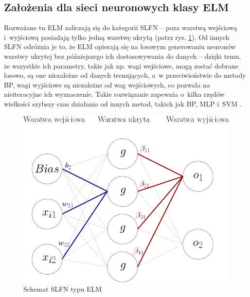 \documentclass{article}
\begin{document}
\subsection{Założenia dla sieci neuronowych klasy ELM}
Rozważane tu ELM zaliczają się do kategorii SLFN -- poza warstwą wejściową i~wyjściową posiadają tylko jedną warstwę ukrytą (patrz rys. \ref{schemat_elm}). Od innych SLFN odróżnia je to, że ELM opierają się na losowym generowaniu neuronów warstwy ukrytej bez późniejszego ich dostosowywania do danych -- dzięki temu, że wszystkie ich parametry, takie jak np. wagi wejściowe, mogą zostać dobrane losowo, są one niezależne od danych trenujących, a~w przeciwieństwie do metody BP, wagi wyjściowe są niezależne od wag wejściowych, co pozwala na nieiteracyjne ich wyznaczenie. Takie rozwiązanie zapewnia o~kilka rzędów wielkości szybszy czas działania od innych metod, takich jak BP, MLP i~SVM \cite{akusok-hpelm}.
\begin{figure}[H]
\includegraphics[width=\textwidth]{schemat_sieci.png}
\caption{Schemat SLFN typu ELM}
\label{schemat_elm}
\end{figure}
\end{document}
